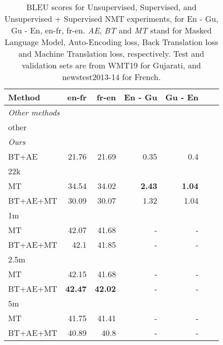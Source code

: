 \begin{table}[ht]
\small
\centering
\begin{tabular}{lrrrrrr}
\toprule
\textbf{Method}  & \textbf{en-fr}  & \textbf{fr-en} &\textbf{En - Gu} & \textbf{Gu - En}  \\ 
\hline
\multicolumn{4}{l}{\emph{Other methods}} \\ \hline
other &  &  &  &  \\
\hline
\multicolumn{4}{l}{\emph{Ours}} \\ \hline\hline
BT+AE    &21.76   &21.69&0.35  &0.4  \\ \hline
22k&&&\\\hline\hline
MT    & 34.54  & 34.02& \textbf{2.43} &\textbf{1.04} \\ 
BT+AE+MT  & 30.09  & 30.07& 1.32 & 1.04 \\ \hline
1m&&&\\\hline\hline
MT   &42.07&41.68& - & -  \\
BT+AE+MT   &42.1&41.85& - & - \\\hline
2.5m&&&&\\\hline\hline
MT   &42.15&41.68& - & -  \\
BT+AE+MT   &\textbf{42.47}&\textbf{42.02}& - & - \\\hline
5m&&&&\\\hline\hline
MT   & 41.75  & 41.41& - & -  \\ 
BT+AE+MT   & 40.89  & 40.8& - & -
\end{tabular}
\bottomrule
\vspace*{0.5em}
\caption{BLEU scores for Unsupervised, Supervised, and Unsupervised + Supervised NMT experiments, for En - Gu, Gu - En, en-fr, fr-en. \emph{AE}, \emph{BT} and \emph{MT} stand for Masked Language Model, Auto-Encoding loss, Back Translation loss and Machine Translation loss, respectively. Test and validation sets are from WMT19 for Gujarati, and newstest2013-14 for French.}
\vspace{-2mm}
\label{table:bleu_results}
\vspace{-0.5em}
\end{table}

%